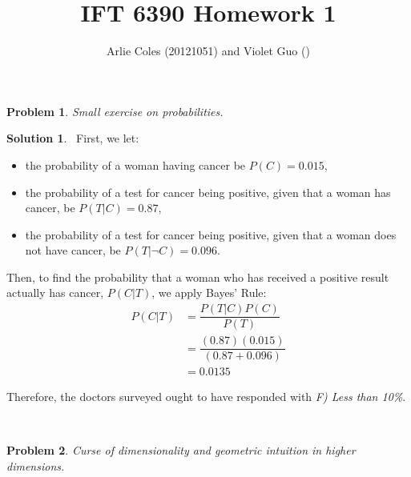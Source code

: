 \documentclass{article}
\newtheorem{problem}{Problem}
\theoremstyle{definition}
\newtheorem*{solution}{Solution}
\begin{document}
 

\def\lc{\left\lceil}   
\def\rc{\right\rceil}
\def\lf{\left\lfloor}
\def\rf{\right\rfloor}


 
 
\title{IFT 6390 Homework 1}
\author{Arlie Coles (20121051) and Violet Guo ()}
\maketitle

\begin{problem}
Small exercise on probabilities.
\end{problem}

\begin{solution}\
	First, we let:
	\begin{itemize}
    	\item the probability of a woman having cancer be $P(C) = 0.015$,
    	\item the probability of a test for cancer being positive, given that a woman has cancer, be $P(T|C) = 0.87$,
        \item the probability of a test for cancer being positive, given that a woman does not have cancer, be $P(T|\neg C) = 0.096$.
     \end{itemize}
     
     Then, to find the probability that a woman who has received a positive result actually has cancer, $P(C|T)$, we apply Bayes' Rule:
     \begin{equation*}
     	\begin{split}
     		P(C|T) & = \dfrac{P(T|C)P(C)}{P(T)}\\
     		& = \dfrac{(0.87)(0.015)}{(0.87+0.096)}\\
            & = 0.0135
        \end{split}
     \end{equation*}
     
     Therefore, the doctors surveyed ought to have responded with \textit{F) Less than 10\%}.
     
\end{solution}\

\begin{problem}
Curse of dimensionality and geometric intuition in higher dimensions.
\end{problem}
\end{document}
